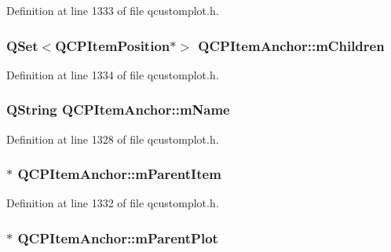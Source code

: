 Definition at line 1333 of file qcustomplot.\-h.

\hypertarget{class_q_c_p_item_anchor_a5f0e67f395a63e2dd0e29ff1dcaf37b7}{
\subsubsection[{m\-Children}]{\setlength{\rightskip}{0pt plus 5cm}Q\-Set$<${\bf Q\-C\-P\-Item\-Position}$\ast$$>$ Q\-C\-P\-Item\-Anchor\-::m\-Children\hspace{0.3cm}{\ttfamily [protected]}}}\label{class_q_c_p_item_anchor_a5f0e67f395a63e2dd0e29ff1dcaf37b7}


Definition at line 1334 of file qcustomplot.\-h.

\hypertarget{class_q_c_p_item_anchor_a23ad4d0ab0d2cbb41a7baf05bcf996ec}{
\subsubsection[{m\-Name}]{\setlength{\rightskip}{0pt plus 5cm}Q\-String Q\-C\-P\-Item\-Anchor\-::m\-Name\hspace{0.3cm}{\ttfamily [protected]}}}\label{class_q_c_p_item_anchor_a23ad4d0ab0d2cbb41a7baf05bcf996ec}


Definition at line 1328 of file qcustomplot.\-h.

\hypertarget{class_q_c_p_item_anchor_a80fad480ad3bb980446ed6ebc00818ae}{
\subsubsection[{m\-Parent\-Item}]{$\ast$ Q\-C\-P\-Item\-Anchor\-::m\-Parent\-Item\hspace{0.3cm}{\ttfamily [protected]}}}\label{class_q_c_p_item_anchor_a80fad480ad3bb980446ed6ebc00818ae}


Definition at line 1332 of file qcustomplot.\-h.

\hypertarget{class_q_c_p_item_anchor_a59b968410831ba91a25cc75a77dde6f5}{
\subsubsection[{m\-Parent\-Plot}]{$\ast$ Q\-C\-P\-Item\-Anchor\-::m\-Parent\-Plot\hspace{0.3cm}{\ttfamily [protected]}}}\label{class_q_c_p_item_anchor_a59b968410831ba91a25cc75a77dde6f5}


